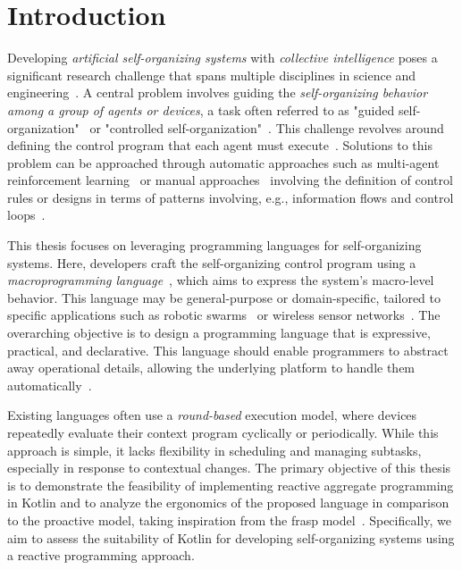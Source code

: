 
\chapter{Introduction}
\label{chap:introduction}

Developing \textit{artificial self-organizing systems} with \textit{collective intelligence} poses a significant research challenge that spans multiple disciplines in science and engineering~\cite{Parunak2015, Gershenson2007, Singh2013, DeNicola2020}. A central problem involves guiding the \textit{self-organizing behavior among a group of agents or devices}, a task often referred to as "guided self-organization"~\cite{Prokopenko2007} or "controlled self-organization"~\cite{Schmeck2010}. This challenge revolves around defining the control program that each agent must execute~\cite{Martius2011}. Solutions to this problem can be approached through automatic approaches such as multi-agent reinforcement learning~\cite{Zhang2021} or manual approaches~\cite{Martius2011} involving the definition of control rules or designs in terms of patterns
involving, e.g., information flows and control loops~\cite{DeWolf2007}.

This thesis focuses on leveraging programming languages for self-organizing systems. Here, developers craft the self-organizing control program using a \textit{macroprogramming language}~\cite{Casadei2023_2, Jnior2022}, which aims to express the system's macro-level behavior. This language may be general-purpose or domain-specific, tailored to specific applications such as robotic swarms~\cite{Brambilla2013} or wireless sensor networks~\cite{Mottola2011}. The overarching objective is to design a programming language that is expressive, practical, and declarative. This language should enable programmers to abstract away operational details, allowing the underlying platform to handle them automatically~\cite{Noor2019, Casadei2020_2}.

Existing languages often use a \textit{round-based} execution model, where devices repeatedly evaluate their context program cyclically or periodically. While this approach is simple, it lacks flexibility in scheduling and managing subtasks, especially in response to contextual changes. The primary objective of this thesis is to demonstrate the feasibility of implementing reactive aggregate programming in Kotlin and to analyze the ergonomics of the proposed language in comparison to the proactive model, taking inspiration from the \ac{frasp} model~\cite{Casadei2023}. Specifically, we aim to assess the suitability of Kotlin for developing self-organizing systems using a reactive programming approach.

